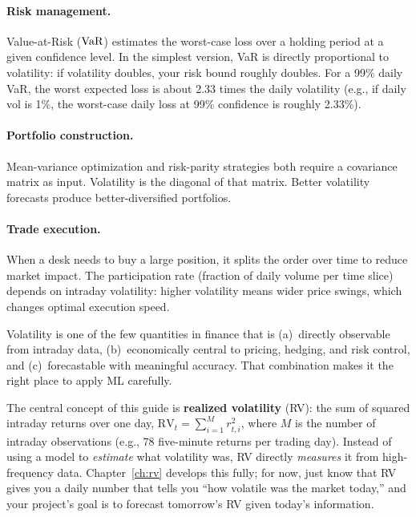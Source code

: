 \paragraph{Risk management.}
Value-at-Risk ($\operatorname{VaR}$) estimates the worst-case loss over a holding period at a given confidence level.
In the simplest version, VaR is directly proportional to volatility: if volatility doubles, your risk bound roughly doubles.
For a 99\% daily VaR, the worst expected loss is about 2.33 times the daily volatility (e.g., if daily vol is 1\%, the worst-case daily loss at 99\% confidence is roughly 2.33\%).

\paragraph{Portfolio construction.}
Mean-variance optimization \citep{Markowitz1952} and risk-parity strategies both require a covariance matrix as input.
Volatility is the diagonal of that matrix.
Better volatility forecasts produce better-diversified portfolios.

\paragraph{Trade execution.}
When a desk needs to buy a large position, it splits the order over time to reduce market impact.
The participation rate (fraction of daily volume per time slice) depends on intraday volatility: higher volatility means wider price swings, which changes optimal execution speed.

\begin{keyidea}
Volatility is one of the few quantities in finance that is (a)~directly observable from intraday data, (b)~economically central to pricing, hedging, and risk control, and (c)~forecastable with meaningful accuracy.
That combination makes it the right place to apply ML carefully.
\end{keyidea}

\begin{prereq}
The central concept of this guide is \textbf{realized volatility} (RV): the sum of squared intraday returns over one day,
$\text{RV}_t = \sum_{i=1}^{M} r_{t,i}^2$,
where $M$ is the number of intraday observations (e.g., 78 five-minute returns per trading day).
Instead of using a model to \emph{estimate} what volatility was, RV directly \emph{measures} it from high-frequency data.
Chapter~\ref{ch:rv} develops this fully; for now, just know that RV gives you a daily number that tells you ``how volatile was the market today,'' and your project's goal is to forecast tomorrow's RV given today's information.
\end{prereq}

